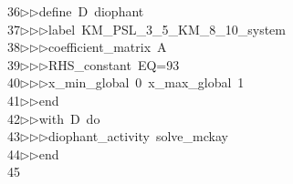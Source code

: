 \begin{tabbing}
36\>$\triangleright$\>$\triangleright$\>define\ D\ diophant\ \\[0pt]
37\>$\triangleright$\>$\triangleright$\>$\triangleright$\>label\ KM\_PSL\_3\_5\_KM\_8\_10\_system\ \\[0pt]
38\>$\triangleright$\>$\triangleright$\>$\triangleright$\>coefficient\_matrix\ A\ \\[0pt]
39\>$\triangleright$\>$\triangleright$\>$\triangleright$\>RHS\_constant\ EQ=93\ \\[0pt]
40\>$\triangleright$\>$\triangleright$\>$\triangleright$\>x\_min\_global\ 0\ x\_max\_global\ 1\ \\[0pt]
41\>$\triangleright$\>$\triangleright$\>end\ \\[0pt]
42\>$\triangleright$\>$\triangleright$\>with\ D\ do\ \\[0pt]
43\>$\triangleright$\>$\triangleright$\>$\triangleright$\>diophant\_activity\ solve\_mckay\ \\[0pt]
44\>$\triangleright$\>$\triangleright$\>end\\[0pt]
45\>\end{tabbing}
